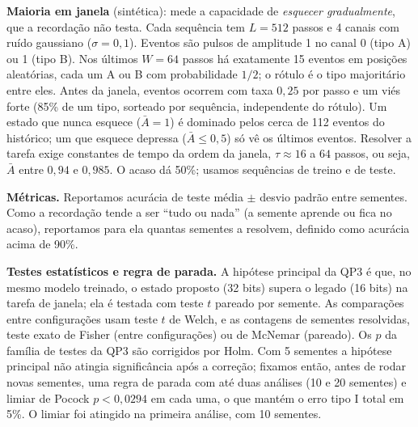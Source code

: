 \documentclass[12pt]{article}
\begin{document}
\textbf{Maioria em janela} (sintética): mede a capacidade de \emph{esquecer gradualmente}, que a recordação não testa. Cada sequência tem $L=512$ passos e 4 canais com ruído gaussiano ($\sigma = 0{,}1$). Eventos são pulsos de amplitude 1 no canal 0 (tipo A) ou 1 (tipo B). Nos últimos $W=64$ passos há exatamente 15 eventos em posições aleatórias, cada um A ou B com probabilidade $1/2$; o rótulo é o tipo majoritário entre eles. Antes da janela, eventos ocorrem com taxa $0{,}25$ por passo e um viés forte (85\% de um tipo, sorteado por sequência, independente do rótulo). Um estado que nunca esquece ($\bar{A}=1$) é dominado pelos cerca de 112 eventos do histórico; um que esquece depressa ($\bar{A}\leq0{,}5$) só vê os últimos eventos. Resolver a tarefa exige constantes de tempo da ordem da janela, $\tau \approx 16$ a $64$ passos, ou seja, $\bar{A}$ entre $0{,}94$ e $0{,}985$. O acaso dá 50\%; usamos \TrainWin{} sequências de treino e \TestWin{} de teste.

\textbf{Métricas.} Reportamos acurácia de teste média $\pm$ desvio padrão entre sementes. Como a recordação tende a ser ``tudo ou nada'' (a semente aprende ou fica no acaso), reportamos para ela quantas sementes a resolvem, definido como acurácia acima de 90\%.

\textbf{Testes estatísticos e regra de parada.} A hipótese principal da QP3 é que, no mesmo modelo treinado, o estado proposto (32 bits) supera o legado (16 bits) na tarefa de janela; ela é testada com teste $t$ pareado por semente. As comparações entre configurações usam teste $t$ de Welch, e as contagens de sementes resolvidas, teste exato de Fisher (entre configurações) ou de McNemar (pareado). Os $p$ da família de testes da QP3 são corrigidos por Holm. Com 5 sementes a hipótese principal não atingia significância após a correção; fixamos então, antes de rodar novas sementes, uma regra de parada com até duas análises (10 e 20 sementes) e limiar de Pocock $p < 0{,}0294$ em cada uma, o que mantém o erro tipo I total em 5\%. O limiar foi atingido na primeira análise, com 10 sementes.
\end{document}
